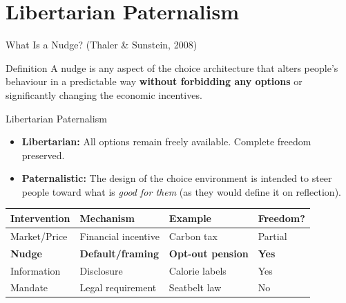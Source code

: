 \documentclass[aspectratio=169]{beamer}
\begin{document}
\section{Libertarian Paternalism}

\begin{frame}{What Is a Nudge? (Thaler \& Sunstein, 2008)}
\begin{block}{Definition}
A \alert{nudge} is any aspect of the choice architecture that alters people's behaviour in a predictable way \textbf{without forbidding any options} or significantly changing the economic incentives.
\end{block}
\begin{block}{Libertarian Paternalism}
\begin{itemize}
  \item \textbf{Libertarian:} All options remain freely available. Complete freedom preserved.
  \item \textbf{Paternalistic:} The design of the choice environment is intended to steer people toward what is \textit{good for them} (as they would define it on reflection).
\end{itemize}
\end{block}
\begin{center}
\begin{tabular}{llll}
\toprule
\textbf{Intervention} & \textbf{Mechanism} & \textbf{Example} & \textbf{Freedom?}\\
\midrule
Market/Price & Financial incentive & Carbon tax & Partial\\
\rowcolor{softpurple}
\textbf{Nudge} & \textbf{Default/framing} & \textbf{Opt-out pension} & \textbf{Yes}\\
Information & Disclosure & Calorie labels & Yes\\
Mandate & Legal requirement & Seatbelt law & No\\
\bottomrule
\end{tabular}
\end{center}
\end{frame}
\end{document}
